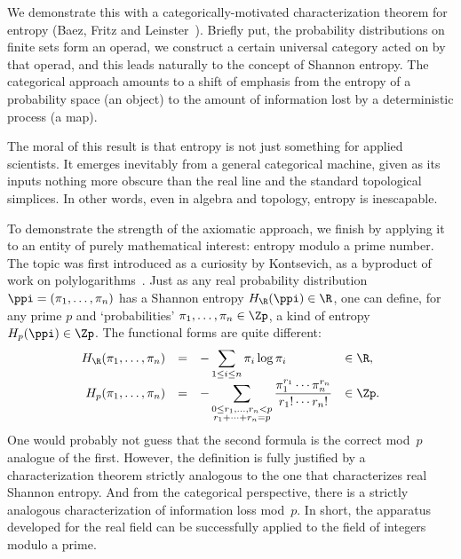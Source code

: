 We demonstrate this with a categorically-motivated characterization theorem
for entropy (Baez, Fritz and Leinster~\cite{CETIL}).  Briefly put, the
probability distributions on finite sets form an operad, we
construct a certain universal category acted on by that operad, and this
leads naturally to the concept of Shannon entropy.  The categorical
approach amounts to a shift of emphasis from the entropy of a probability
space (an object) to the amount of information lost by a deterministic
process (a map).

The moral of this result is that entropy is not just something for applied
scientists.  It emerges inevitably from a general categorical machine,
given as its inputs nothing more obscure than the real line and the
standard topological simplices.  In other words, even in algebra and
topology, entropy is inescapable.

To demonstrate the strength of the axiomatic approach, we finish by
applying it to an entity of purely mathematical interest: entropy modulo a
prime number.  The topic was first introduced as a curiosity by
Kontsevich,%
%
% 
as a byproduct of work on polylogarithms~\cite{KontOHL}.  Just as any real
probability distribution $\ppi = (\pi_1, \ldots, \pi_n)$ has a Shannon
entropy $H_\R(\ppi) \in \R$, one can define, for any
prime%
%
%
$p$ and `probabilities' $\pi_1, \ldots, \pi_n \in \Zp$, a kind of entropy
$H_p(\ppi) \in \Zp$.  The functional forms are quite different:
\[
\begin{array}{rcll}
H_\R(\pi_1, \ldots, \pi_n)      &
= &
\displaystyle
-\sum_{1 \leq i \leq n} \pi_i \log \pi_i
&\in \R, \\[1.5ex]
H_p(\pi_1, \ldots, \pi_n)       &
=&
\displaystyle
-\sum_{\substack{0 \leq r_1, \ldots, r_n < p\\ r_1 + \cdots + r_n = p}}
\frac{\pi_1^{r_1} \cdots \pi_n^{r_n}}{r_1! \cdots r_n!}
&\in \Zp.
\end{array}
\]
One would probably not guess that the second formula is the correct mod~$p$
analogue of the first.  However, the definition is fully justified by a
characterization theorem strictly analogous to the one that characterizes
real Shannon entropy.  And from the categorical perspective, there is a
strictly analogous characterization of information loss mod~$p$.  In short,
the apparatus developed for the real field can be successfully applied to
the field of integers modulo a prime.

\introbreak\pagebreak

